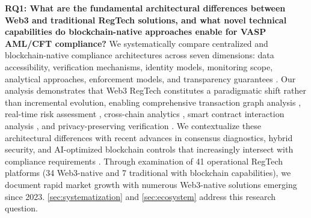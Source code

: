 \documentclass[conference,compsoc]{IEEEtran}
\begin{document}
\noindent\textbf{RQ1: What are the fundamental architectural differences between Web3 and traditional RegTech solutions, and what novel technical capabilities do blockchain-native approaches enable for VASP AML/CFT compliance?}
We systematically compare centralized and blockchain-native compliance architectures across seven dimensions: data accessibility, verification mechanisms, identity models, monitoring scope, analytical approaches, enforcement models, and transparency guarantees \cite{arner2016fintechregtechreconceptualization,zetsche2017fintechtechfinregulatory}. Our analysis demonstrates that Web3 RegTech constitutes a paradigmatic shift rather than incremental evolution, enabling comprehensive transaction graph analysis \cite{meiklejohn2013fistfulbitcoinscharacterizing,reid2013analysisanonymitybitcoin}, real-time risk assessment \cite{moser2014riskscoringbitcoin,weber2019antimoneylaunderingbitcoin}, cross-chain analytics \cite{yousaf2019tracingtransactionscryptocurrency,zamyatin2021sokcommunicationdistributed}, smart contract interaction analysis \cite{chen2020understandingethereumgraph,qin2021attackingdefiecosystem}, and privacy-preserving verification \cite{ben-sasson2017scalablezeroknowledge,zhang2024blockchainzeroknowledge}. We contextualize these architectural differences with recent advances in consensus diagnostics, hybrid security, and AI-optimized blockchain controls that increasingly intersect with compliance requirements \cite{ahn2024blockchainconsensusmechanisms,cai2025blockchainconsensusalgorithm,wei2024enhancedconsensusalgorithm,venkatesan2024blockchainsecurityenhancement,yuan2025aidrivenoptimizationblockchain}. Through examination of 41 operational RegTech platforms (34 Web3-native and 7 traditional with blockchain capabilities), we document rapid market growth with numerous Web3-native solutions emerging since 2023. \autoref{sec:systematization} and \autoref{sec:ecosystem} address this research question.
\end{document}
